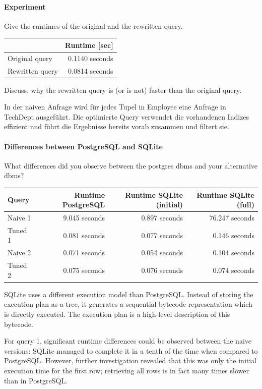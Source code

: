 \documentclass[11pt]{scrartcl}
\begin{document}
\paragraph{Experiment}

Give the runtimes of the original and the rewritten query.

\begin{table}[H]
  \centering
  \begin{tabular}{l|r}
    & Runtime [sec] \tabularnewline
    \hline
    Original query  & 0.1140 seconds \tabularnewline
    Rewritten query & 0.0814 seconds \tabularnewline
  \end{tabular}
\end{table}

Discuss, why the rewritten query is (or is not) faster than the original query.

In der naiven Anfrage wird für jedes Tupel in Employee eine Anfrage in TechDept ausgeführt. Die optimierte Query verwendet die vorhandenen Indizes effizient und führt die Ergebnisse bereits vorab zusammen und filtert sie.

\paragraph{Differences between PostgreSQL and SQLite}

What differences did you observe between the postgres dbms and your alternative dbms?

\begin{table}[H]
  \centering
  \begin{tabular}{l|r|r|r}
    Query & Runtime PostgreSQL & Runtime SQLite (initial) & Runtime SQLite (full) \tabularnewline
    \hline
    Naive 1 & 9.045 seconds & 0.897 seconds & 76.247 seconds \tabularnewline
    Tuned 1 & 0.081 seconds & 0.077 seconds & 0.146 seconds \tabularnewline
    Naive 2 & 0.071 seconds & 0.054 seconds & 0.104 seconds \tabularnewline
    Tuned 2 & 0.075 seconds & 0.076 seconds & 0.074 seconds \tabularnewline
  \end{tabular}
\end{table}

SQLite uses a different execution model than PostgreSQL.  Instead of storing the execution plan as a tree, it generates a sequential bytecode representation which is directly executed.  The execution plan is a high-level description of this bytecode.

For query 1, significant runtime differences could be observed between the naive versions: SQLite managed to complete it in a tenth of the time when compared to PostgreSQL. However, further investigation revealed that this was only the initial execution time for the first row; retrieving all rows is in fact many times slower than in PostgreSQL.
\end{document}
